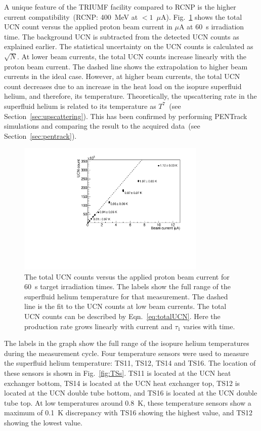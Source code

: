 A unique feature of the TRIUMF facility compared to RCNP is the higher
current compatibility~(RCNP: 400~MeV at $<1$~$\mu$A).
Fig.~\ref{fig:counts_vs_beam} shows the total UCN count versus the
applied proton beam current in $\mu$A at 60~s irradiation time. The
background UCN is subtracted from the detected UCN counts as explained
earlier. The statistical uncertainty on the UCN counts is calculated
as $\sqrt{N}$. At lower beam currents, the total UCN counts increase
linearly with the proton beam current. The dashed line shows the
extrapolation to higher beam currents in the ideal case. However, at
higher beam currents, the total UCN count decreases due to an increase
in the heat load on the isopure superfluid helium, and therefore, its
temperature. Theoretically, the upscattering rate in the superfluid
helium is related to its temperature as $T^7$~(see
Section~\ref{sec:upscattering}). This has been confirmed by performing
PENTrack simulations and comparing the result to the acquired
data~(see Section~\ref{sec:pentrack}).



\begin{figure}[h!]
  \centering
  \includegraphics[width=0.8\textwidth]{UCNCounts_vs_Beam.pdf}
  \caption[UCN counts versus proton beam current]{The total UCN counts
    versus the applied proton beam current for 60~s target irradiation
    times. The labels show the full range of the superfluid helium
    temperature for that measurement. The dashed line is the fit to
    the UCN counts at low beam currents. The total UCN counts can be
    described by Eqn.~\ref{eq:totalUCN}. Here the production rate
    grows linearly with current and $\tau_1$ varies with time.}
  \label{fig:counts_vs_beam}
\end{figure}


The labels in the graph show the full range of the isopure helium
temperatures during the measurement cycle. Four temperature sensors
were used to measure the superfluid helium temperature: TS11, TS12,
TS14 and TS16. The location of these sensors is shown in
Fig.~\ref{fig:TSs}. TS11 is located at the UCN heat exchanger bottom,
TS14 is located at the UCN heat exchanger top, TS12 is located at the
UCN double tube bottom, and TS16 is located at the UCN double tube
top. At low temperatures around 0.8~K, these temperature sensors show
a maximum of 0.1~K discrepancy with TS16 showing the highest value,
and TS12 showing the lowest value.


